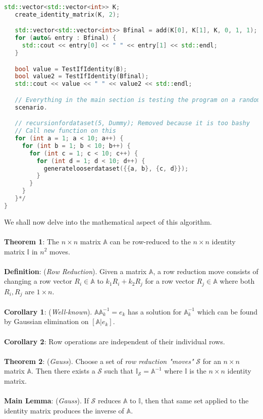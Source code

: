 \documentclass{article}
\begin{document}
\begin{lstlisting}[language=C++]
   std::vector<std::vector<int>> K;
   create_identity_matrix(K, 2);

   std::vector<std::vector<int>> Bfinal = add(K[0], K[1], K, 0, 1, 1);
   for (auto& entry : Bfinal) {
     std::cout << entry[0] << " " << entry[1] << std::endl;
   }

   bool value = TestIfIdentity(B);
   bool value2 = TestIfIdentity(Bfinal);
   std::cout << value << " " << value2 << std::endl;

   // Everything in the main section is testing the program on a random
   scenario.

   // recursionfordataset(5, Dummy); Removed because it is too bashy
   // Call new function on this
   for (int a = 1; a < 10; a++) {
     for (int b = 1; b < 10; b++) {
       for (int c = 1; c < 10; c++) {
         for (int d = 1; d < 10; d++) {
           generatelooserdataset({{a, b}, {c, d}});
         }
       }
     }
   }*/
}
\end{lstlisting}
We shall now delve into the mathematical aspect of this algorithm. \\ \\
\textbf{Theorem 1}: The $n\times n$ matrix $\mathbb{A}$ can be row-reduced to the $n\times n$ identity matrix $\mathbb{I}$ in $n^2$ moves. \\ \\
\textbf{Definition}: (\textit{Row Reduction}). Given a matrix $\mathbb{A}$, a row reduction move consists of changing a row vector $R_i\in\mathbb{A}$ to $k_1R_i+k_2R_j$ for a row vector $R_j\in \mathbb{A}$ where both $R_i, R_j$ are $1\times n$. \\ \\
\textbf{Corollary 1}: (\textit{Well-known}). $\mathbb{A}\mathbb{A}_k^{-1}=e_k$ has a solution for $\mathbb{A}_k^{-1}$ which can be found by Gaussian elimination on $[\mathbb{A}|e_k]$. \\ \\
\textbf{Corollary 2}: Row operations are independent of their individual rows. \\ \\
\textbf{Theorem 2}: (\textit{Gauss}). Choose a set of \textit{row reduction "moves"} $\mathcal{S}$ for an $n\times n$ matrix $\mathbb{A}$. Then there exists a $\mathcal{S}$ such that $ \mathbb{I}_{\mathcal{S}}=\mathbb{A}^{-1}$ where $\mathbb{I}$ is the $n\times n$ identity matrix. \\ \\
\textbf{Main Lemma}: (\textit{Gauss}). If $\mathcal{S}$ reduces $\mathbb{A}$ to $\mathbb{I}$, then that same set applied to the identity matrix produces the inverse of $\mathbb{A}$. \\ 
\end{document}
